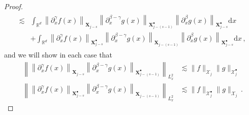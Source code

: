 \documentclass[AHL,Unicode,longabstracts,published]{cedram}
\renewcommand{\d}{\mathrm{d}}
\newcommand{\R}{\mathbb{R}}
\newcommand{\XX}{\mathcal{X}}
\newcommand{\Sh}{\bm{X}}
\newcommand{\Shp}{\bm{X}^{\bullet}}
\newcommand{\SSh}{\bm{\XX}}
\newcommand{\SShp}{\bm{\XX}^{\bullet}}
\begin{document}
\begin{proof}
\begin{multline}
\begin{aligned}
\lesssim & \int_{\R^{d}} \left\| \partial_x^\gamma f(x)\right\|_{ \Sh_{j-s} } \left\| \partial_x^{\beta-\gamma} g(x) \right\|_{ \Shp_{j - (s-1) } } \left\| \partial_x^\beta g(x) \right\|_{ \Shp_{j - s } } \d x \\
& + \int_{\R^{d}} \left\| \partial_x^\gamma f(x) \right\|_{ \Shp_{j-s} } \left\| \partial_x^{\beta-\gamma} g(x) \right\|_{ \Sh_{j - (s-1) } } \left\| \partial_x^\beta g(x) \right\|_{ \Shp_{j - s } } \d x \,,
\end{aligned}
\end{multline}
and we will show in each case that
\begin{equation}\label{eq:degenerate_bilinear_goal}
\begin{split}
\left\|\left\| \partial_x^\gamma f(x) \right\|_{ \Sh_{j-s} } \left\| \partial_x^{\beta-\gamma} g(x) \right\|_{ \Shp_{j - (s-1) } } \right\|_{L^{2}_{x}} &\lesssim \|f\|_{\SSh_{j}}\|g\|_{\SShp_{j}}\\
\left\|\left\| \partial_x^\gamma f(x) \right\|_{ \Shp_{j-s} } \left\| \partial_x^{\beta-\gamma} g(x) \right\|_{ \Sh_{j - (s-1) } } \right\|_{L^{2}_{x}} &\lesssim \|f\|_{\SShp_{j}}\|g\|_{\SSh_{j}}\,.
\end{split}
\end{equation}


\end{proof}
\end{document}
